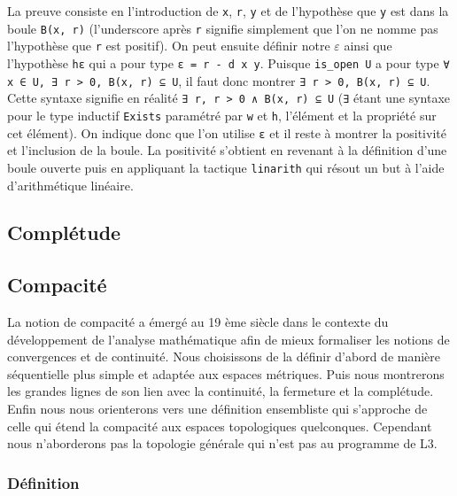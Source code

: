 \documentclass[a4paper, 12pt]{article}
\newcommand{\lean}[1]{\texttt{#1}}
\begin{document}
La preuve consiste en l'introduction de \lean{x}, \lean{r}, \lean{y} et de l'hypothèse que \lean{y} est dans la boule \lean{B(x, r)} (l'underscore après \lean{r} signifie simplement que l'on ne nomme pas l'hypothèse que \lean{r} est positif). On peut ensuite définir notre $ε$ ainsi que l'hypothèse \lean{hε} qui a pour type \lean{ε = r - d x y}. Puisque \lean{is_open U} a pour type \lean{∀ x ∈ U, ∃ r > 0, B(x, r) ⊆ U}, il faut donc montrer \lean{∃ r > 0, B(x, r) ⊆ U}. Cette syntaxe signifie en réalité \lean{∃ r, r > 0 ∧ B(x, r) ⊆ U} (\lean{∃} étant une syntaxe pour le type inductif \lean{Exists} paramétré par \lean{w} et \lean{h}, l'élément et la propriété sur cet élément). On indique donc que l'on utilise \lean{ε} et il reste à montrer la positivité et l'inclusion de la boule. La positivité s'obtient en revenant à la définition d'une boule ouverte puis en appliquant la tactique \lean{linarith} qui résout un but à l'aide d'arithmétique linéaire.

\subsection{Complétude}



\subsection{Compacité}

La notion de compacité a émergé au 19 ème siècle dans le contexte du développement de l'analyse mathématique afin de mieux formaliser les notions de convergences et de continuité. 
Nous choisissons de la définir d'abord de manière séquentielle plus simple et adaptée aux espaces métriques. Puis nous montrerons les grandes lignes de son lien avec la continuité, la fermeture et la complétude. Enfin nous nous orienterons vers une définition ensembliste qui s'approche de celle qui étend la compacité aux espaces topologiques quelconques. Cependant nous n'aborderons pas la topologie générale qui n'est pas au programme de L3.\\

\vspace{\baselineskip} 
\vspace{\baselineskip} 

\subsubsection{Définition}
\end{document}
